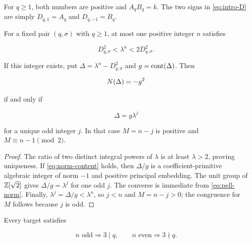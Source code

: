 For $q\geqslant1$, both numbers are positive and $A_qB_q=k$. The two signs
in \cref{eq:intro-D} are simply $D_{q,1}=A_q$ and
$D_{q,-1}=B_q$.

\begin{lemma}
\label{lem:normalisation}
For a fixed pair $(q,\sigma)$ with $q\geqslant1$, at most one positive
integer $n$ satisfies

\begin{equation}
 D_{q,\sigma}^2<\lambda^n<2D_{q,\sigma}^2.
 \label{eq:nearest-window}
\end{equation}

If this integer exists, put $\Delta=\lambda^n-D_{q,\sigma}^2$ and
$g=\operatorname{cont}\!\left(\Delta\right)$. Then

\begin{equation}
 N\!\left(\Delta\right)=-g^2
 \label{eq:norm-content}
\end{equation}

if and only if

\begin{equation}
 \Delta=g\lambda^j
 \label{eq:normalised-unit}
\end{equation}

for a unique odd integer $j$. In that case $M=n-j$ is positive and
$M\equiv n-1\pmod2$.
\end{lemma}

\begin{proof}
The ratio of two distinct integral powers of $\lambda$ is at least
$\lambda>2$, proving uniqueness. If \cref{eq:norm-content} holds, then
$\Delta/g$ is a coefficient-primitive algebraic integer of norm $-1$ and
positive principal embedding. The unit group of $\mathbb{Z}[\sqrt2]$ gives
$\Delta/g=\lambda^j$ for one odd $j$. The converse is immediate from
\cref{eq:pell-norm}. Finally,
$\lambda^j=\Delta/g<\lambda^n$, so $j<n$ and $M=n-j>0$; the congruence for
$M$ follows because $j$ is odd.
\end{proof}

\begin{proposition}
\label{prop:parity-selector}
Every target satisfies

\begin{equation}
 n\text{ odd}\Longrightarrow3\mid q,
 \qquad
 n\text{ even}\Longrightarrow3\nmid q.
 \label{eq:parity-selector}
\end{equation}
\end{proposition}

